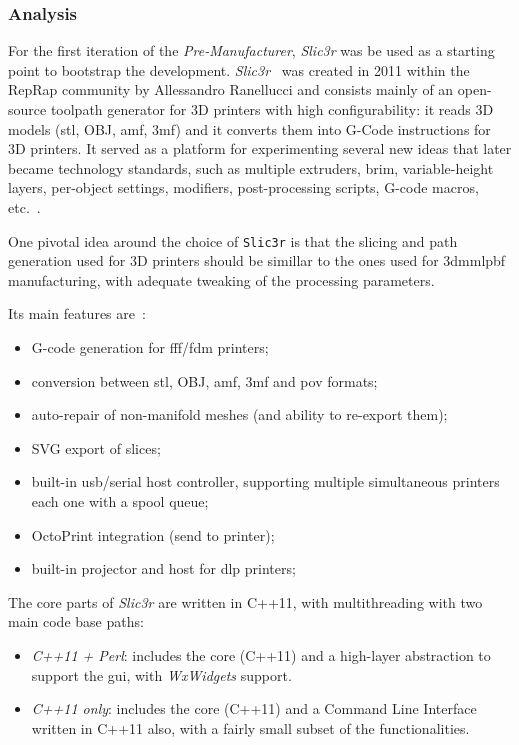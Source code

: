 \subsubsection{Analysis}%
\label{sec:analysis-premanuf}
For the first iteration of the \emph{Pre-Manufacturer}, \emph{Slic3r}
was be used as a starting point to bootstrap the development.
\emph{Slic3r}~\cite{Slic3r} was created in 2011 within the RepRap community by
Allessandro Ranellucci and consists mainly of an open-source toolpath generator
for 3D printers with high configurability:
it reads 3D models (\gls{stl}, OBJ, \gls{amf}, \gls{3mf}) and it converts them
into G-Code instructions for 3D printers.
It served as a platform for experimenting several new ideas that later became
technology standards, such as multiple extruders, brim, variable-height layers,
per-object settings, modifiers, post-processing scripts, G-code macros,
etc.~\cite{slic3r2018repo}.

One pivotal idea around the choice of \texttt{Slic3r} is that the slicing and
path generation used for 3D printers should be simillar to the ones used for
\gls{3dmmlpbf} manufacturing, with adequate tweaking of the processing parameters.

Its main features are~\cite{slic3r2018repo}:
\begin{itemize}
\item G-code generation for \gls{fff}/\gls{fdm} printers;
\item conversion between \gls{stl}, OBJ, \gls{amf}, \gls{3mf} and \gls{pov} formats;
\item auto-repair of non-manifold meshes (and ability to re-export them);
\item SVG export of slices;
\item built-in \gls{usb}/serial host controller, supporting multiple simultaneous
  printers each one with a spool queue;
\item OctoPrint integration (send to printer);
\item built-in projector and host for \gls{dlp} printers;
\end{itemize}

The core parts of \emph{Slic3r} are written in C++11, with multithreading
with two main code base paths:
\begin{itemize}
\item \emph{C++11 + Perl}: includes the core (C++11) and a high-layer abstraction
  to support the \gls{gui}, with \emph{WxWidgets} support. 
\item \emph{C++11 only}: includes the core (C++11) and a Command Line Interface written in
  C++11 also, with a fairly small subset of the functionalities.
\end{itemize}

